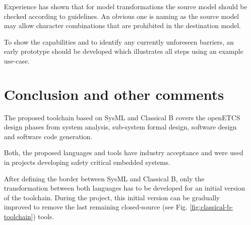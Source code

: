 Experience has shown that for model transformations the source model
should be checked according to guidelines. An obvious one is naming as
the source model may allow character combinations that are prohibited
in the destination model.

To show the capabilities and to identify any currently unforeseen
barriers, an early prototype should be developed which illustrates all
steps using an example use-case.

\section{Conclusion and other comments}

The proposed toolchain based on SysML and Classical B covers the
openETCS design phases from system analysis, sub-system formal design,
software design and software code generation.

Both, the proposed languages and tools have industry acceptance and
were used in projects developing safety critical embedded systems. 

After defining the border between SysML and Classical B, only the
transformation between both languages has to be developed for an
initial version of the toolchain. During the project, this initial
version can be gradually improved to remove the last remaining
closed-source (see Fig. \ref{fig:classical-b-toolchain}) tools.
